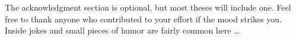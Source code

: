 
The acknowledgment section is optional, but most theses will include one.  Feel free to thank anyone who contributed to your effort if the mood strikes you.  Inside jokes and small pieces of humor are fairly common here \ldots


